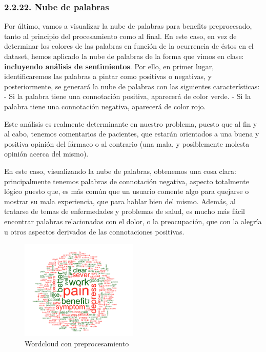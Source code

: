 \documentclass[spanish,]{article}
\begin{document}
\subsubsection{2.2.22. Nube de palabras}\label{nube-de-palabras}

Por último, vamos a visualizar la nube de palabras para benefits
preprocesado, tanto al principio del procesamiento como al final. En
este caso, en vez de determinar los colores de las palabras en función
de la ocurrencia de éstos en el dataset, hemos aplicado la nube de
palabras de la forma que vimos en clase: \textbf{incluyendo análisis de
sentimientos}. Por ello, en primer lugar, identificaremos las palabras a
pintar como positivas o negativas, y posteriormente, se generará la nube
de palabras con las siguientes características: - Si la palabra tiene
una connotación positiva, aparecerá de color verde. - Si la palabra
tiene una connotación negativa, aparecerá de color rojo.

Este análisis es realmente determinante en nuestro problema, puesto que
al fin y al cabo, tenemos comentarios de pacientes, que estarán
orientados a una buena y positiva opinión del fármaco o al contrario
(una mala, y posiblemente molesta opinión acerca del mismo).

En este caso, visualizando la nube de palabras, obtenemos una cosa
clara: principalmente tenemos palabras de connotación negativa, aspecto
totalmente lógico puesto que, es más común que un usuario comente algo
para quejarse o mostrar su mala experiencia, que para hablar bien del
mismo. Además, al tratarse de temas de enfermedades y problemas de
salud, es mucho más fácil encontrar palabras relacionadas con el dolor,
o la preocupación, que con la alegría u otros aspectos derivados de las
connotaciones positivas.

\begin{figure}[h]
    \centering
    \includegraphics[width=0.5\textwidth]{imagenes/wordcloud1.png}
    \caption{Wordcloud con preprocesamiento}
    \label{benefits2}
\end{figure}
\end{document}
